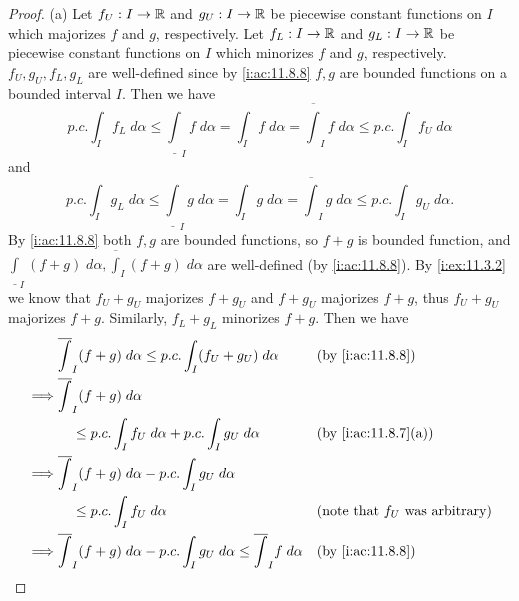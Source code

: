 \begin{proof}{(a)}
  Let \(f_U : I \to \mathbb{R}\) and \(g_U : I \to \mathbb{R}\) be piecewise constant functions on \(I\) which majorizes \(f\) and \(g\), respectively.
  Let \(f_L : I \to \mathbb{R}\) and \(g_L : I \to \mathbb{R}\) be piecewise constant functions on \(I\) which minorizes \(f\) and \(g\), respectively.
  \(f_U, g_U, f_L, g_L\) are well-defined since by \cref{i:ac:11.8.8} \(f, g\) are bounded functions on a bounded interval \(I\).
  Then we have
  \[
    p.c. \int_I f_L \; d \alpha \leq \underline{\int}_I f \; d \alpha = \int_I f \; d \alpha = \overline{\int}_I f \; d \alpha \leq p.c. \int_I f_U \; d \alpha
  \]
  and
  \[
    p.c. \int_I g_L \; d \alpha \leq \underline{\int}_I g \; d \alpha = \int_I g \; d \alpha = \overline{\int}_I g \; d \alpha \leq p.c. \int_I g_U \; d \alpha.
  \]
  By \cref{i:ac:11.8.8} both \(f, g\) are bounded functions, so \(f + g\) is bounded function, and \(\underline{\int}_I (f + g) \; d \alpha, \overline{\int}_I (f + g) \; d \alpha\) are well-defined (by \cref{i:ac:11.8.8}).
  By \cref{i:ex:11.3.2} we know that \(f_U + g_U\) majorizes \(f + g_U\) and \(f + g_U\) majorizes \(f + g\), thus \(f_U + g_U\) majorizes \(f + g\).
  Similarly, \(f_L + g_L\) minorizes \(f + g\).
  Then we have
  \begin{align*}
             & \overline{\int}_I (f + g) \; d \alpha \leq p.c. \int_I (f_U + g_U) \; d \alpha                               &   & \by{i:ac:11.8.8}                         \\
    \implies & \overline{\int}_I (f + g) \; d \alpha                                                                                                                       \\
             & \quad \leq p.c. \int_I f_U \; d \alpha + p.c. \int_I g_U \; d \alpha                                         &   & \by{i:ac:11.8.7}[a]                      \\
    \implies & \overline{\int}_I (f + g) \; d \alpha - p.c. \int_I g_U \; d \alpha                                                                                         \\
             & \quad \leq p.c. \int_I f_U \; d \alpha                                                                       &   & \text{(note that \(f_U\) was arbitrary)} \\
    \implies & \overline{\int}_I (f + g) \; d \alpha - p.c. \int_I g_U \; d \alpha \leq \overline{\int}_I f \; d \alpha     &   & \by{i:ac:11.8.8}                         \\

\end{align*}
\end{proof}
